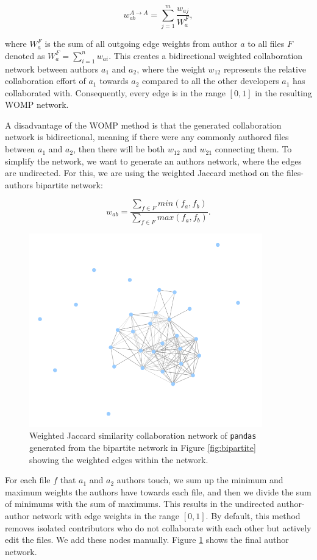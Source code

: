 \[ w_{ab}^{A \rightarrow A} = \sum_{j=1}^m \frac{w_{aj}}{W_a^F}, \]

where $W_a^F$ is the sum of all outgoing edge weights from author $a$ to all files $F$ denoted as $W_a^F = \sum_{i=1}^n w_{ai}$. This creates a bidirectional weighted collaboration network between authors $a_1$ and $a_2$, where the weight $w_{12}$ represents the relative collaboration effort of $a_1$ towards $a_2$ compared to all the other developers $a_1$ has collaborated with. Consequently, every edge is in the range $[0,1]$ in the resulting WOMP network.


A disadvantage of the WOMP method is that the generated collaboration network is bidirectional, meaning if there were any commonly authored files between $a_1$ and $a_2$, then there will be both $w_{12}$ and $w_{21}$ connecting them. To simplify the network, we want to generate an authors network, where the edges are undirected. For this, we are using the weighted Jaccard method on the files-authors bipartite network:

\[ w_{ab} = \frac{\sum_{f \in F}min(f_a, f_b)}{\sum_{f \in F}max(f_a, f_b)}. \]

\begin{figure}[!htbp]
    \centering
    \includegraphics[width=0.9\textwidth]{figures/jaccard.png}
    \caption{Weighted Jaccard similarity collaboration network of \texttt{pandas} generated from the bipartite network in Figure \ref{fig:bipartite} showing the weighted edges within the network.}
    \label{fig:jaccard}
\end{figure}

For each file $f$ that $a_1$ and $a_2$ authors touch, we sum up the minimum and maximum weights the authors have towards each file, and then we divide the sum of minimums with the sum of maximums. This results in the undirected author-author network with edge weights in the range $[0, 1]$. By default, this method removes isolated contributors who do not collaborate with each other but actively edit the files. We add these nodes manually. Figure \ref{fig:jaccard} shows the final author network.


